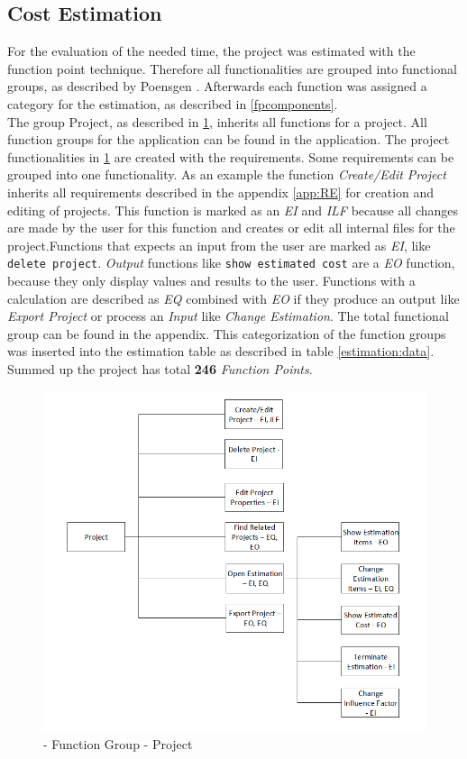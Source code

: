 \subsection{Cost Estimation}
For the evaluation of the needed time, the project was estimated with the function point technique. Therefore all functionalities are grouped into functional groups, as described by Poensgen \cite{FPKompakt}. Afterwards each function was assigned a category for the estimation, as described in \ref{fpcomponents}.\\
The group Project, as described in \ref{fig:projectFunctionalityGroup}, inherits all functions for a project. All function groups for the application can be found in the application. The project functionalities in \ref{fig:projectFunctionalityGroup} are created with the requirements. Some requirements can be grouped into one functionality. As an example the function \textit{Create/Edit Project} inherits all requirements described in the appendix \ref{app:RE} for creation and editing of projects. This function is marked as an \textit{EI} and \textit{ILF} because all changes are made by the user for this function and creates or edit all internal files for the project.Functions that expects an input from the user are marked as \textit{EI}, like \texttt{delete project}. \textit{Output} functions like \texttt{show estimated cost} are a \textit{EO} function, because they only display values and results to the user. Functions with a calculation are described as \textit{EQ} combined with \textit{EO} if they produce an output like \textit{Export Project} or process an \textit{Input} like \textit{Change Estimation}. The total functional group can be found in the appendix. This categorization of the function groups was inserted into the estimation table as described in table \ref{estimation:data}. Summed up the project has total \textbf{246} \textit{Function Points}.
\begin{figure}[h] 
	\centering 
	\includegraphics[width=14cm]{images/ScreenOverviewProject.PNG} 
	\caption{- Function Group - Project} 
	\label{fig:projectFunctionalityGroup}
\end{figure}
